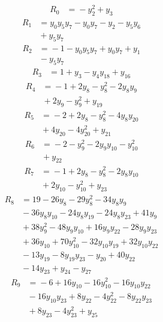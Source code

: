\begin{align*}
R_{0} &={} -y_{2}^{2} +y_{3}
\end{align*}
\begin{align*}
R_{1} &={} y_{0}y_{5}y_{7} -y_{0}y_{7} -y_{2} -y_{5}y_{6} \\
 &{} +y_{5}y_{7}
\end{align*}
\begin{align*}
R_{2} &={} -1 -y_{0}y_{5}y_{7} +y_{0}y_{7} +y_{1} \\
 &{} -y_{5}y_{7}
\end{align*}
\begin{align*}
R_{3} &={} 1 +y_{3} -y_{4}y_{18} +y_{16}
\end{align*}
\begin{align*}
R_{4} &={} -1 +2y_{8} -y_{8}^{2} -2y_{8}y_{9} \\
 &{} +2y_{9} -y_{9}^{2} +y_{19}
\end{align*}
\begin{align*}
R_{5} &={} -2 +2y_{8} -y_{8}^{2} -4y_{8}y_{20} \\
 &{} +4y_{20} -4y_{20}^{2} +y_{21}
\end{align*}
\begin{align*}
R_{6} &={} -2 -y_{9}^{2} -2y_{9}y_{10} -y_{10}^{2} \\
 &{} +y_{22}
\end{align*}
\begin{align*}
R_{7} &={} -1 +2y_{8} -y_{8}^{2} -2y_{8}y_{10} \\
 &{} +2y_{10} -y_{10}^{2} +y_{23}
\end{align*}
\begin{align*}
R_{8} &={} 19 -26y_{8} -29y_{8}^{2} -34y_{8}y_{9} \\
 &{} -36y_{8}y_{10} -24y_{8}y_{19} -24y_{8}y_{23} +41y_{9} \\
 &{} +38y_{9}^{2} -48y_{9}y_{10} +16y_{9}y_{22} -28y_{9}y_{23} \\
 &{} +36y_{10} +70y_{10}^{2} -32y_{10}y_{19} +32y_{10}y_{22} \\
 &{} -13y_{19} -8y_{19}y_{23} -y_{20} +40y_{22} \\
 &{} -14y_{23} +y_{24} -y_{27}
\end{align*}
\begin{align*}
R_{9} &={} -6 +16y_{10} -16y_{10}^{2} -16y_{10}y_{22} \\
 &{} -16y_{10}y_{23} +8y_{22} -4y_{22}^{2} -8y_{22}y_{23} \\
 &{} +8y_{23} -4y_{23}^{2} +y_{25}
\end{align*}
